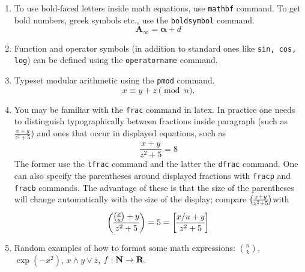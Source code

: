 \begin{enumerate}
\item To use bold-faced letters inside math equations, use {\tt mathbf} command.
To get bold numbers, greek symbols etc., use the {\tt boldsymbol}
command.
\begin{equation}
\mathbf{A}_{\boldsymbol{\infty}} = \boldsymbol{\alpha}+ d
\end{equation}

\item Function and operator symbols (in addition to standard ones like {\tt sin, cos, log})
can be defined using the {\tt operatorname} command. 

\item Typeset modular arithmetic using the {\tt pmod} command.
\begin{equation}
x \equiv y + z \pmod{n}.
\end{equation}
\item You may be familiar with the {\tt frac} command in latex. In practice one needs
to distinguish typographically between fractions inside paragraph (such as
$\tfrac{x+y}{z^2 +5}$) and  ones that occur in displayed equations, such as
\begin{equation}
\dfrac{x+ y}{z^2 + 5} = 8
\end{equation}
The former use the {\tt tfrac} command and the latter the {\tt dfrac} command.
One can also specify the parentheses around displayed fractions with 
{\tt fracp} and {\tt fracb} commands. The advantage of
these is that the size of the parentheses
will change automatically with the size of the display; compare $\fracp{x+y}{z^2 +5}$with 
$$
\fracp{\fracp{x}{u}+y}{z^2 +5} = 5 = \fracb{x/u+y}{z^2 + 5}
$$

\item Random examples of how to format some math expressions: $\binom{n}{k}$,
$\exp(-x^2)$, $x \wedge y \vee \overline{z}$, $f : \mbox{\bf N} \to \mbox{\bf R}$.

\end{enumerate}










